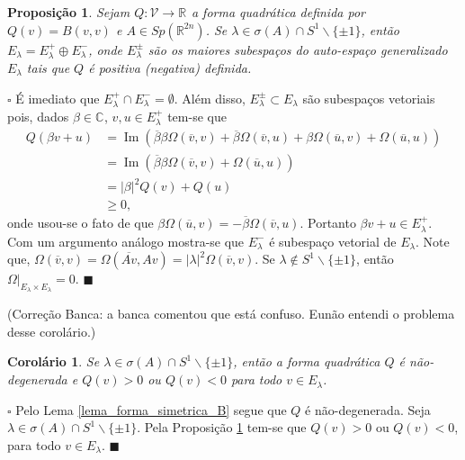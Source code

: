 \documentclass[12pt]{book}
\newtheorem{corolario}[teorema]{Corolário}
\newtheorem{proposicao}[teorema]{Proposição}
\newenvironment{prova}[1]{$\square$ #1}{\hfill$\blacksquare$}
\DeclareMathOperator{\Ima}{Im}
\newcommand{\autoespaco}[1]{E_{#1}}
\newcommand{\circulo}{S^{1}}
\newcommand{\complementar}[2]{#1 \backslash #2}
\newcommand{\complexificado}[1]{\mathcal{#1}}
\newcommand{\complexo}[1]{\mathbb{C}^{#1}}
\newcommand{\espectrooperador}[1]{\sigma(#1)}
\newcommand{\formaSimpleticaExtendida}[2]{\Omega(#1, #2)}
\newcommand{\gruposimpletico}[1]{Sp(#1)}
\newcommand{\parteImaginaria}[1]{\Ima{(#1)}}
\newcommand{\real}[1]{\mathbb{R}^{#1}}
\newcommand{\reta}{\real{}}
\newcommand{\alerta}[1]{{\color{red}#1}}
\newcommand{\correcaobanca}[1]{\alerta{(Correção Banca: #1)}}
\begin{document}
	\begin{proposicao}\label{proposicao_forma_quadratica_Q}
		Sejam  $Q: \complexificado{V} \to \reta$ a forma quadrática definida por $Q(v) = B(v,v)$ e $A \in \gruposimpletico{\real{2n}}$. Se $\lambda\in \espectrooperador{A} \cap \complementar{\circulo}{\{\pm 1 \} }$, então   $\autoespaco{\lambda} = \autoespaco{\lambda}^{+}\oplus \autoespaco{\lambda}^{-}$, onde $\autoespaco{\lambda}^{\pm}$ são os maiores subespaços do auto-espaço generalizado $\autoespaco{\lambda}$ tais que $Q$ é positiva (negativa) definida.
	\end{proposicao}
	\begin{prova}
		É imediato que $\autoespaco{\lambda}^{+} \cap \autoespaco{\lambda}^{-} = \emptyset$. Além disso, $\autoespaco{\lambda}^{\pm} \subset \autoespaco{\lambda}$ são subespaços vetoriais pois, dados $\beta\in \complexo{}$, $v, u\in \autoespaco{\lambda}^{+}$ tem-se que 
		$$
		\begin{aligned}
		Q(\beta v +u) &= \parteImaginaria{\overline{\beta}\beta\formaSimpleticaExtendida{\overline{v}}{v}+ \overline{\beta}\formaSimpleticaExtendida{\overline{v}}{u}+ \beta\formaSimpleticaExtendida{\overline{u}}{v}+ \formaSimpleticaExtendida{\overline{u}}{u}}
		\\
		&=\parteImaginaria{\overline{\beta}\beta\formaSimpleticaExtendida{\overline{v}}{v}+ \formaSimpleticaExtendida{\overline{u}}{u}}
		\\
		&=|\beta|^{2}Q(v)+Q(u)
		\\
		&\geq0,
		\end{aligned}
		$$
		onde usou-se o fato de que $\beta\formaSimpleticaExtendida{\overline{u}}{v}=-\overline{\beta}\formaSimpleticaExtendida{\overline{v}}{u}$. Portanto $\beta v +u \in \autoespaco{\lambda}^{+}$. Com um argumento análogo mostra-se que $\autoespaco{\lambda}^{-}$ é subespaço vetorial de $\autoespaco{\lambda}$. Note que, $\formaSimpleticaExtendida{\overline{v}}{v}=\formaSimpleticaExtendida{\overline{Av}}{Av} =|\lambda|^{2}\formaSimpleticaExtendida{\overline{v}}{v}$. Se $\lambda \notin \complementar{\circulo}{\{\pm 1 \} }$, então $\Omega|_{\autoespaco{\lambda}\times \autoespaco{\lambda}} = 0$.
	\end{prova}
	
	\correcaobanca{a banca comentou que está confuso. Eunão entendi o problema desse corolário.}
	
	\begin{corolario}\label{corolario_nao_degeneracidade_Q}
		Se $\lambda\in \espectrooperador{A} \cap \complementar{\circulo}{\{\pm 1 \} }$, então a forma quadrática $Q$ é não-degenerada e $Q(v)>0$ ou $Q(v)<0$ para todo $v \in \autoespaco{\lambda}$.
	\end{corolario}
	\begin{prova}
		Pelo Lema \ref{lema_forma_simetrica_B} segue que $Q$ é não-degenerada. Seja $\lambda\in \espectrooperador{A} \cap \complementar{\circulo}{\{\pm 1 \} }$. Pela Proposição \ref{proposicao_forma_quadratica_Q} tem-se que $Q(v)>0$ ou $Q(v)<0$, para todo $v\in \autoespaco{\lambda}$. 
	\end{prova}
	
\end{document}
